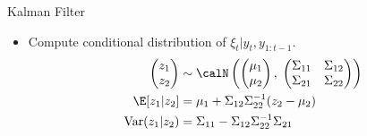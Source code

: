 \documentclass[handout]{beamer}
\newcommand{\Var}{\operatorname{Var}}
\begin{document}
\begin{frame}[shrink]{Kalman Filter}
\begin{itemize}
  \item Compute conditional distribution of $\xi_t|y_t,y_{1:t-1}$.
    \begin{align*}
      \begin{pmatrix}
        z_1 \\ z_2
      \end{pmatrix}
      &\sim
      \calN\left(
      \begin{pmatrix}
        \mu_1 \\ \mu_2
      \end{pmatrix}
      ,\;
      \begin{pmatrix}
        \Sigma_{11} & \Sigma_{12} \\
        \Sigma_{21} & \Sigma_{22}
      \end{pmatrix}
      \right)
      \\
      \E[z_1|z_2]
      &=
      \mu_1
      +
      \Sigma_{12}
      \Sigma_{22}^{-1}
      (z_2-\mu_2)
      \\
      \Var(z_1|z_2)
      &=
      \Sigma_{11}
      -
      \Sigma_{12}
      \Sigma_{22}^{-1}
      \Sigma_{21}
    \end{align*}

\end{itemize}
\end{frame}
\end{document}
